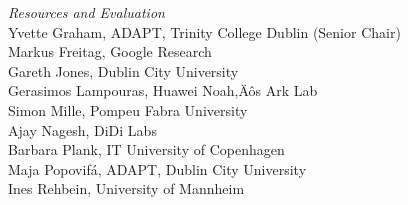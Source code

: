 \emph{Resources and Evaluation} \\
\hspace*{0.2in} Yvette Graham, ADAPT, Trinity College Dublin (Senior Chair)\\
\hspace*{0.2in} Markus Freitag, Google Research\\
\hspace*{0.2in} Gareth Jones, Dublin City University\\
\hspace*{0.2in} Gerasimos Lampouras, Huawei Noah‚Äôs Ark Lab\\
\hspace*{0.2in} Simon Mille, Pompeu Fabra University\\
\hspace*{0.2in} Ajay Nagesh, DiDi Labs\\
\hspace*{0.2in} Barbara Plank, IT University of Copenhagen\\
\hspace*{0.2in} Maja Popoviƒá, ADAPT, Dublin City University\\
\hspace*{0.2in} Ines Rehbein, University of Mannheim\\

